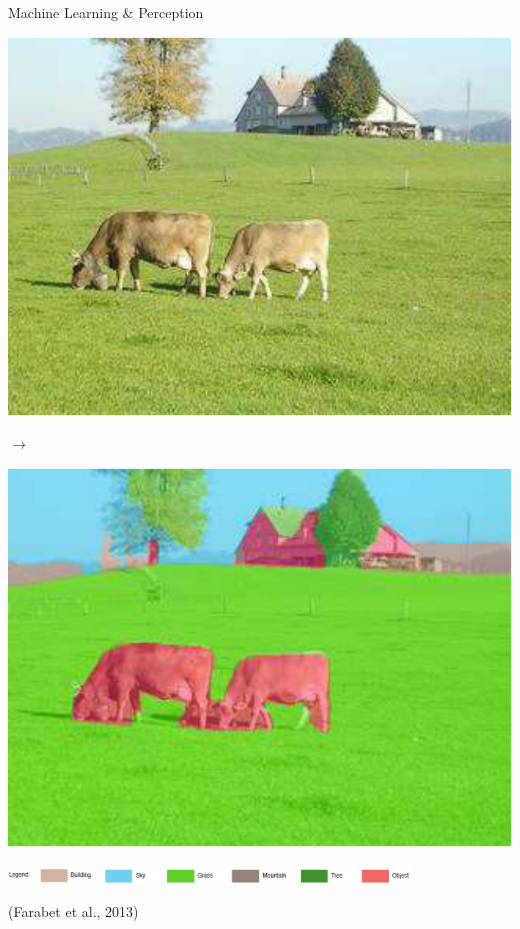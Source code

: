 \documentclass{beamer}
\begin{document}
\begin{frame}{Machine Learning \& Perception}
    \vspace{10mm}
    \begin{minipage}{0.44\textwidth}
        \centering
        \includegraphics[width=0.8\columnwidth]{farabet_pami_img1.pdf}
    \end{minipage}
    \hfill
    $\to$
    \hfill
    \begin{minipage}{0.44\textwidth}
        \centering
        \includegraphics[width=0.8\columnwidth]{farabet_pami_img2.pdf}
    \end{minipage}
    \centering
    \vspace{1mm}
    \includegraphics[width=0.8\textwidth]{farabet_pami_img_legend.pdf}
    \vspace{-3mm}
    \begin{flushright}
        \scriptsize (Farabet et al., 2013)
    \end{flushright}

    \vfill
\end{frame}
\end{document}
